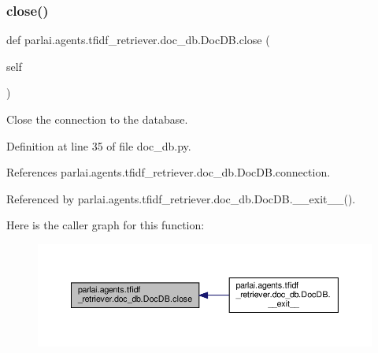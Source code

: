 \subsubsection{\texorpdfstring{close()}{close()}}
{\footnotesize\ttfamily def parlai.\+agents.\+tfidf\+\_\+retriever.\+doc\+\_\+db.\+Doc\+D\+B.\+close (\begin{DoxyParamCaption}\item[{}]{self }\end{DoxyParamCaption})}

\begin{DoxyVerb}Close the connection to the database.\end{DoxyVerb}
 

Definition at line 35 of file doc\+\_\+db.\+py.



References parlai.\+agents.\+tfidf\+\_\+retriever.\+doc\+\_\+db.\+Doc\+D\+B.\+connection.



Referenced by parlai.\+agents.\+tfidf\+\_\+retriever.\+doc\+\_\+db.\+Doc\+D\+B.\+\_\+\+\_\+exit\+\_\+\+\_\+().

Here is the caller graph for this function\+:
\nopagebreak
\begin{figure}[H]
\begin{center}
\leavevmode
\includegraphics[width=350pt]{classparlai_1_1agents_1_1tfidf__retriever_1_1doc__db_1_1DocDB_a080619f722b8a5c83ec934d3d1391a01_icgraph}
\end{center}
\end{figure}
\mbox{\label{classparlai_1_1agents_1_1tfidf__retriever_1_1doc__db_1_1DocDB_adc970ff10e2070e93cc22f95ad03f8f1}} 
